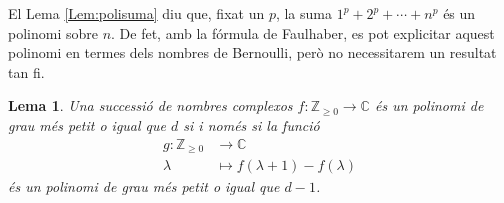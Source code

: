 \documentclass{article}
\newtheorem{lema}{Lema}
\theoremstyle{definition}
\begin{document}
El Lema \ref{Lem:polisuma} diu que, fixat un $p$, la suma $1^p+2^p+\cdots+n^p$ \'{e}s un polinomi sobre $n$. De fet, amb la f\'{o}rmula de Faulhaber, es pot explicitar aquest polinomi en termes dels nombres de Bernoulli, per\`{o} no necessitarem un resultat tan fi.

\begin{lema}\label{Lem:poliresta}
Una successi\'{o} de nombres complexos $f:\mathbb{Z}_{\geq0}\rightarrow\mathbb{C}$ \'{e}s un polinomi de grau m\'{e}s petit o igual que $d$ si i nom\'{e}s si la funci\'{o}
\begin{align*}
    g:\mathbb{Z}_{\geq0}&\longrightarrow\mathbb{C}\\
    \lambda&\longmapsto f(\lambda+1)-f(\lambda)
\end{align*}
\'{e}s un polinomi de grau m\'{e}s petit o igual que $d-1$.
\end{lema}
\end{document}
